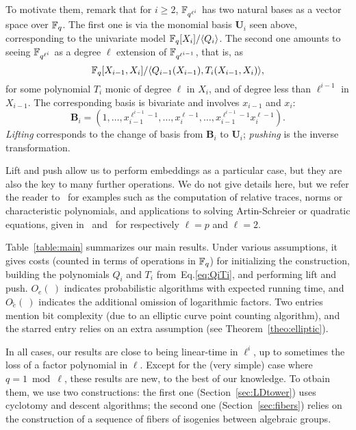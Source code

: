 \documentclass{sig-alternate}
\newcommand{\bb}{\mathbf{B}}
\newcommand{\uu}{\mathbf{U}}  %
\begin{document}
To motivate them, remark that for $i \ge 2$, $\mathbb{F}_{q^{\ell^{i}}}$ has
two natural bases as a vector space over $\mathbb{F}_q$. The first one is via
the monomial basis $\uu_{i}$ seen above, corresponding to the
univariate model $\mathbb{F}_q[X_{i}]/ \langle Q_{i} \rangle$. The second one
amounts to seeing $\mathbb{F}_{q^{\ell^{i}}}$ as a degree $\ell$ extension of
$\mathbb{F}_{q^{\ell^{i-1}}}$, that is, as
\begin{equation}\label{eq:QiTi}
\mathbb{F}_q[X_{i-1},X_i]/\langle Q_{i-1}(X_{i-1}), T_i(X_{i-1},X_i)\rangle,  
\end{equation}
for some polynomial $T_i$ monic of degree $\ell$ in $X_{i}$, and of
degree less than $\ell^{i-1}$ in $X_{i-1}$.  The corresponding basis is
bivariate and involves $x_{i-1}$ and $x_i$:
\begin{equation}
  \label{eq:bi-basis}
  \bb_{i} = (1,\ldots,x_{i-1}^{\ell^{i-1}-1},\ldots,x_i^{\ell-1},\ldots,x_{i-1}^{\ell^{i-1}-1}x_i^{\ell-1}).
\end{equation}
{\em Lifting} corresponds to the change of basis from $\bb_i$ to
$\uu_i$; {\em pushing} is the inverse transformation.

Lift and push allow us to perform embeddings as a particular case, but
they are also the key to many further operations. We do not give
details here, but we refer the reader
to~\cite{df+schost12,DoSc12,LeSc12} for examples such as the
computation of relative traces, norms or characteristic polynomials,
and applications to solving Artin-Schreier or quadratic equations,
given in~\cite{df+schost12} and~\cite{DoSc12} for respectively
$\ell=p$ and $\ell=2$.

Table~\ref{table:main} summarizes our main results.  Under various
assumptions, it gives costs (counted in terms of operations in $\mathbb{F}_q$)
for initializing the construction, building the polynomials $Q_i$ and
$T_i$ from~Eq.\eqref{eq:QiTi}, and performing lift and push. $O_e(\ )$
indicates probabilistic algorithms with expected running time, and
$O\tilde{_e}(\ )$ indicates the additional omission of logarithmic
factors.  Two entries mention bit complexity (due to an elliptic curve
point counting algorithm), and the starred entry relies on an extra
assumption (see Theorem~\ref{theo:elliptic}).

In all cases, our results are close to being linear-time in $\ell^i$,
up to sometimes the loss of a factor polynomial in $\ell$.  Except for
the (very simple) case where $q=1 \bmod \ell$, these results are new,
to the best of our knowledge. To otbain them, we use two
constructions: the first one (Section~\ref{sec:LDtower}) uses
cyclotomy and descent algorithms; the second one
(Section~\ref{sec:fibers}) relies on the construction of a sequence of
fibers of isogenies between algebraic groups. 
\end{document}
